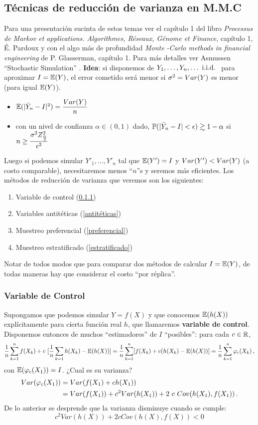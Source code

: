 \subsection{Técnicas de reducción de varianza en M.M.C}
Para una presentación sucinta de estos temas ver el capítulo 1 del libro \textit{Processus de Markov et applications. Algorithmes, Réseaux, Génome et
Finance}, capítulo 1, É. Pardoux \cite{pardoux} y con el algo más de profundidad \textit{Monte -Carlo methods in financial engineering} de P. Glasserman, capítulo 1. Para más detalles ver Asmussen ``Stochastic Simulation'' \cite{asm}.
\newp \textbf{Idea}: si disponemos de $Y_1,\dots,Y_n,\dots \iid$ para aproximar $I=\E(Y)$, el error cometido será menor si $\sigma^2=\var(Y)$ es menor (para igual $\E(Y)$).
\begin{itemize}
    \item $\E(|\bar{Y}_n-I|^2)=\displaystyle\frac{\var(Y)}{n}$
    \item con un nivel de confianza $\alpha\in(0,1)$ dado, $\P(|\bar{Y}_n-I|<\epsilon)\gtrsim 1-\alpha$ si $n\geq\nmc$
\end{itemize}
Luego si podemos simular $Y'_1,\dots,Y'_n$ tal que $\E(Y')=I$ y $\var(Y')<\var(Y)$ (a costo comparable), necesitaremos menos ``$n$''s y seremos más eficientes.
\newp Los métodos de reducción de varianza que veremos son los siguientes:
\begin{enumerate}
    \item Variable de control (\ref{control})
    \item Variables antitéticas (\ref{antitéticas})
    \item Muestreo preferencial (\ref{preferencial})
    \item Muestreo estratificado (\ref{estratificado})
\end{enumerate}
Notar de todos modos que para comparar dos métodos de calcular $I=\E(Y)$, de todas maneras hay que considerar el costo ``por réplica''.

\subsubsection{Variable de Control}
\label{control}
Supongamos que podemos simular $Y=f(X)$ y que conocemos $\E(h(X))$ explícitamente para cierta función real $h$, que llamaremos  \textbf{variable de control}.
\newp Disponemos entonces de muchos ``estimadores'' de $I$ ``posibles'': para cada $c\in\R$,
$$ \sumfx+c\mbox{ }[\frac{1}{n}\sum_{k=1}h(X_k)-\E(h(X))] 
 =\frac{1}{n}\sum_{k=1}^n[f(X_k)+c(h(X_k)-\E(h(X))]
 =\frac{1}{n}\sum^n_{k=1}\varphi_c(X_k) \, ,$$
con $\E(\varphi_c(X_1))=I$.\hspace{.3cm} ¿Cual es su varianza?
\begin{alignat*}{2}
    \var(\varphi_c(X_1)) & = \var(f(X_1)+ch(X_1)) \\
     & = \var(f(X_1))+c^2\var(h(X_1))+2\mbox{ }c\mbox{ }Cov(h(X_1),f(X_1)) \, .
\end{alignat*}
De lo anterior se desprende que la varianza disminuye cuando se cumple:
$$ c^2 Var(h(X)) + 2c Cov(h(X),f(X)) < 0 $$

